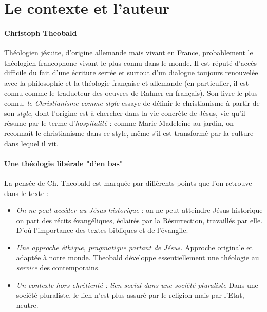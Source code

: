 




\section{ Le contexte et l’auteur}

\paragraph{Christoph Theobald} Théologien jésuite, d'origine allemande mais vivant en France, probablement le théologien francophone vivant le plus connu dans le monde. Il est réputé d'accès difficile du fait d'une écriture serrée et surtout d'un dialogue toujours renouvelée avec la philosophie et la théologie française et allemande (en particulier, il est connu comme le traducteur des oeuvres de Rahner en français).  Son livre le plus connu, \textit{le Christianisme comme style} \cite{theobald_christianisme_2007} essaye de définir le christianisme à partir de son \textit{style}, dont l'origine est à chercher dans la vie concrète de Jésus, vie qu'il résume par le terme d'\textit{hospitalité} : comme Marie-Madeleine au jardin, on reconnaît le christianisme dans ce style, même s'il est transformé par la culture dans lequel il vit.


\paragraph{Une théologie libérale "d'en bas"} La pensée de Ch. Theobald est marquée par différents points que l'on retrouve dans le texte : 
\begin{itemize}
    \item \textit{On ne peut accéder au Jésus historique} : on ne peut atteindre Jésus historique  on part des récits évangéliques, éclairés par la Résurrection, travaillés par elle. D'où l'importance des textes bibliques et de l'évangile.
    \item  \textit{Une approche éthique, pragmatique partant de Jésus.}    Approche originale et adaptée à notre monde. Theobald développe essentiellement une  théologie au \textit{service} des contemporains. 
    \item \textit{Un contexte hors chrétienté : lien social dans une société pluraliste} Dans une société pluraliste,  le lien n'est plus assuré par le religion mais par l'Etat, neutre.
\end{itemize}
  

